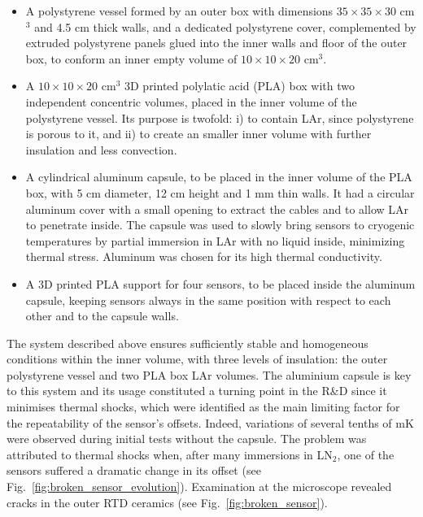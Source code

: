 \begin{itemize}
    \item A polystyrene vessel formed by an outer box with dimensions $35\times35\times30$ cm$^3$ and 4.5 cm thick walls, and a dedicated polystyrene cover, complemented by extruded polystyrene panels glued into the inner walls and floor of the outer box, to conform an inner empty volume of $10\times10\times20$ cm$^3$.
    \item A $10\times10\times20$ cm$^3$ 3D printed polylatic acid (PLA) box with two independent concentric volumes, placed in the inner volume of the polystyrene vessel. Its purpose is twofold: i) to contain LAr, since polystyrene is porous to it, and ii) to create an smaller inner volume  with further insulation and less convection.
    \item A cylindrical aluminum capsule, to be placed in the inner volume of the PLA box,  with 5 cm diameter, 12 cm height and 1 mm thin walls. It had a circular aluminum cover with a small opening to extract the cables and to allow LAr to penetrate inside. The capsule was used to slowly bring sensors to cryogenic temperatures by partial immersion in LAr with no liquid inside, minimizing thermal stress. Aluminum was chosen for its high thermal conductivity.
    \item  A 3D printed PLA support for four sensors, to be placed inside the aluminum capsule, keeping sensors always in the same position with respect to each other and to the capsule walls.
\end{itemize}

The system described above ensures sufficiently stable and homogeneous conditions within the inner volume, with three levels of insulation: the outer polystyrene vessel and two PLA box LAr volumes. The aluminium capsule is key to this system and its usage constituted a turning point in the R\&D since it minimises thermal shocks, which were identified as the main limiting factor for the repeatability of the sensor's offsets. Indeed, variations of several tenths of mK were observed during initial tests without the capsule. The problem was attributed to thermal shocks when, after many immersions in LN$_{2}$, one of the sensors suffered a dramatic change in its offset (see Fig.~\ref{fig:broken_sensor_evolution}). Examination at the microscope revealed cracks in the outer RTD ceramics (see Fig.~\ref{fig:broken_sensor}).

